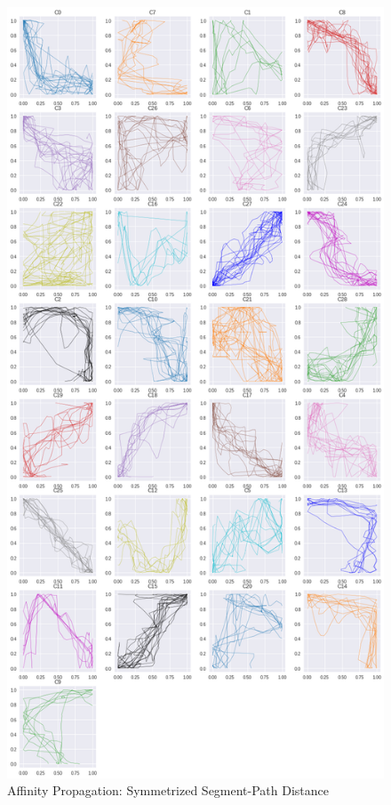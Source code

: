 \begin{figure}[h]
  \centering
  \includegraphics[width=\linewidth,height=\textheight,keepaspectratio]{figs/clusters/CLU_AP_ALL[SSPD].png}
  \caption{Affinity Propagation: Symmetrized Segment-Path Distance }
\end{figure}
